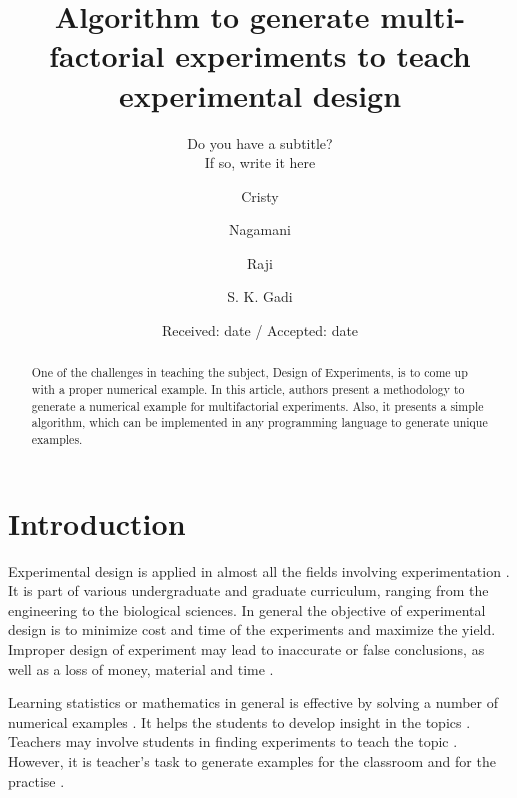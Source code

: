 \documentclass[twocolumn]{svjour3}          %
\begin{document}
	
	
	
	\title{Algorithm to generate multi-factorial experiments to teach experimental design%
	}
	\subtitle{Do you have a subtitle?\\ If so, write it here}
	\author{Cristy  \and
		Nagamani \and
		Raji \and
		S. K. Gadi
	}
	\date{Received: date / Accepted: date}
	\maketitle
	\begin{abstract}
		One of the challenges in teaching the subject, Design of Experiments, is to come up with a proper numerical example. In this article, authors present a methodology to generate a numerical example for multifactorial experiments. Also, it presents a simple algorithm, which can be implemented in any programming language to generate unique examples.
	\end{abstract}
	\section{Introduction}
	Experimental design is applied in almost all the fields involving experimentation \cite{fisher1937design,quinn2002experimental,montgomery2008design,antony2014design}. It is part of various undergraduate and graduate curriculum, ranging from the engineering to the biological sciences. In general the objective of experimental design is to minimize cost and time of the experiments and maximize the yield. Improper design of experiment may lead to inaccurate or false conclusions, as well as a loss of money, material and time \cite{Festing2003341}.
	\par
	Learning statistics or mathematics in general is effective by solving a number of numerical examples \cite{zhu1987learning}. It helps the students to develop insight in the topics \cite{renkl1997learning}. Teachers may involve students in finding experiments to teach the topic \cite{Hunter1977Some,fried2006mathematics,Hiebert82}. However, it is teacher's task to generate examples for the classroom and for the practise \cite{Deborah2008}.
	\par
	
\end{document}
